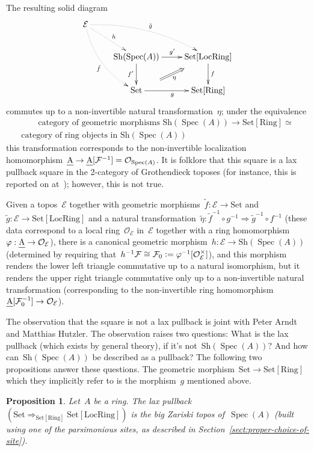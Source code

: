 \documentclass[10pt,reqno,a4paper]{amsbook}
\theoremstyle{definition}
\theoremstyle{plain}
\newtheorem{prop}[defn]{Proposition}
\theoremstyle{remark}
\newcommand{\E}{\mathcal{E}}
\newcommand{\F}{\mathcal{F}}
\renewcommand{\O}{\mathcal{O}}
\let\oldul\ul
\renewcommand{\ul}[1]{\text{\oldul{$#1$}}}
\newcommand{\Set}{\mathrm{Set}}
\newcommand{\Sh}{\mathrm{Sh}}
\newcommand{\Ring}{\mathrm{Ring}}
\newcommand{\LocRing}{\mathrm{LocRing}}
\DeclareMathOperator{\Spec}{Spec}
\newcommand{\?}{\,{:}\,}
\renewcommand{\_}{\mathpunct{.}\,}
\newcommand{\defeq}{\vcentcolon=}
\begin{document}
The resulting solid diagram
\[ \xymatrix{
  \E \ar@/^1pc/@{.>}[rrd]^{\tilde g} \ar@/_1pc/@{.>}[ddr]_{\tilde f} \ar@{.>}[rd]^h \\
  & \Sh(\Spec(A)) \ar[r]^{g'} \ar[d]_{f'} & \Set[\LocRing] \ar[d]^f \\
  & \Set \ar[r]_g \ar@{}[ur]^(.3){}="a"^(.7){}="b" \ar@{=>}_\eta "a";"b" & \Set[\Ring]
} \]
commutes up to a non-invertible natural transformation~$\eta$; under the
equivalence
\begin{multline*}
  \qquad\text{category of geometric morphisms~$\Sh(\Spec(A)) \to \Set[\Ring]$} \simeq \\
  \text{category of ring objects in~$\Sh(\Spec(A))$}\qquad
\end{multline*}
this transformation corresponds to the non-invertible localization homomorphism~$\ul{A} \to
\ul{A}[\F^{-1}] = \O_{\Spec(A)}$. It is folklore that this square is a lax
pullback square in the 2-category of Grothendieck toposes (for instance, this
is reported on at~\cite{arndt:lax-pullback}); however, this is not true.

Given a topos~$\E$ together with geometric morphisms~$\tilde f : \E \to \Set$
and~$\tilde g : \E \to \Set[\LocRing]$ and a natural transformation~$\tilde
\eta : \tilde f^{-1} \circ g^{-1} \Rightarrow \tilde g^{-1} \circ f^{-1}$
(these data correspond to a local ring~$\O_\E$ in~$\E$ together with a ring
homomorphism~$\varphi : \ul{A} \to \O_\E$), there is a canonical geometric morphism~$h :
\E \to \Sh(\Spec(A))$ (determined by requiring that~$h^{-1}\F \cong \F_0 \defeq
\varphi^{-1}[\O_\E^\times]$), and this morphism renders the lower left triangle
commutative up to a natural isomorphism, but it renders the upper right
triangle commutative only up to a non-invertible natural transformation
(corresponding to the non-invertible ring homomorphism~$\ul{A}[\F_0^{-1}] \to
\O_\E$).

The observation that the square is not a lax pullback is joint with Peter Arndt
and Matthias Hutzler. The observation raises two questions: What is the lax
pullback (which exists by general theory), if it's not~$\Sh(\Spec(A))$?
And how can~$\Sh(\Spec(A))$ be described as a pullback? The following two
propositions answer these questions. The geometric morphism~$\Set \to
\Set[\Ring]$ which they implicitly refer to is the morphism~$g$ mentioned
above.

\begin{prop}Let~$A$ be a ring. The lax pullback~$(\Set \Rightarrow_{\Set[\Ring]}
\Set[\LocRing])$ is the big Zariski topos of~$\Spec(A)$ (built using one of the
parsimonious sites, as described in Section~\ref{sect:proper-choice-of-site}).
\end{prop}
\end{document}
